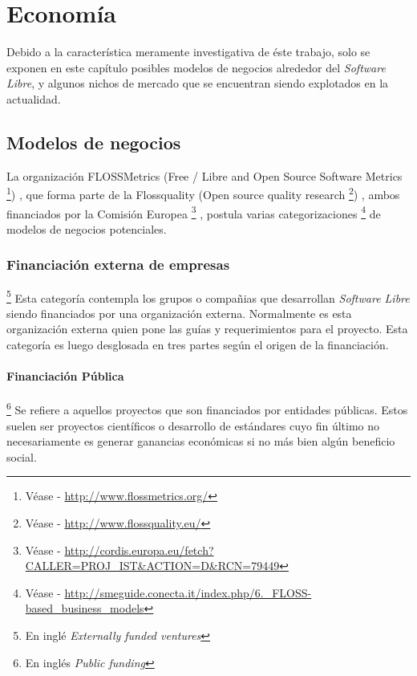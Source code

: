 \chapter{Econom\'ia}

Debido a la caracter\'istica meramente investigativa de \'este trabajo, solo
se exponen en este cap\'itulo posibles modelos de negocios alrededor del
\emph{Software Libre}, y algunos nichos de mercado que se encuentran siendo
explotados en la actualidad.\\

\section{Modelos de negocios}
La organizaci\'on FLOSSMetrics 
(Free / Libre and Open Source Software Metrics
\footnote{V\'ease - \url{http://www.flossmetrics.org/}})
, que forma parte de la Flossquality (Open source quality research
\footnote{V\'ease - \url{http://www.flossquality.eu/}})
, ambos financiados por la Comisi\'on Europea
\footnote{V\'ease -
\url{http://cordis.europa.eu/fetch?CALLER=PROJ_IST&ACTION=D&RCN=79449}}
, postula varias categorizaciones
\footnote{V\'ease -
\url{http://smeguide.conecta.it/index.php/6._FLOSS-based_business_models}} 
de modelos de negocios potenciales.


\subsection{Financiaci\'on externa de empresas}\footnote{En ingl\'e
\emph{Externally funded ventures}}
%
Esta categor\'ia contempla los grupos o compa\~nias que desarrollan
\emph{Software Libre} siendo financiados por una organizaci\'on externa.
Normalmente es esta organizaci\'on externa quien pone las gu\'ias y
requerimientos para el proyecto. Esta categor\'ia es luego desglosada en tres
partes seg\'un el origen de la financiaci\'on.

\subsubsection{Financiaci\'on P\'ublica}\footnote{En ingl\'es \emph{Public
funding}}
%
Se refiere a aquellos proyectos que son financiados por entidades p\'ublicas.
Estos suelen ser proyectos cient\'ificos o desarrollo de est\'andares cuyo
fin
\'ultimo no necesariamente es generar ganancias econ\'omicas si no m\'as bien
alg\'un beneficio social.

